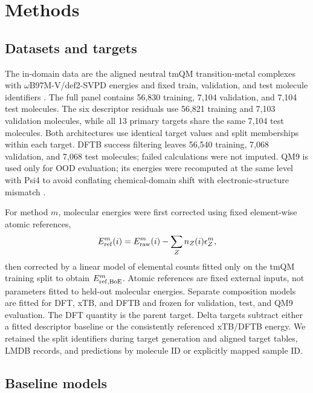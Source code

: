 \section{Methods}
\label{sec:methods}

\subsection{Datasets and targets}
\label{sec:methods-datasets-targets}

The in-domain data are the aligned neutral tmQM transition-metal complexes with \(\omega\)B97M-V/def2-SVPD energies and fixed train, validation, and test molecule identifiers \cite{balcells2020tmqm,mardirossian2016wb97mv,rappoport2010def2svpd}. The full panel contains 56,830 training, 7,104 validation, and 7,104 test molecules. The six descriptor residuals use 56,821 training and 7,103 validation molecules, while all 13 primary targets share the same 7,104 test molecules. Both architectures use identical target values and split memberships within each target. DFTB success filtering leaves 56,540 training, 7,068 validation, and 7,068 test molecules; failed calculations were not imputed. QM9 is used only for OOD evaluation; its energies were recomputed at the same level with Psi4 to avoid conflating chemical-domain shift with electronic-structure mismatch \cite{ramakrishnan2014quantum,parrish2017psi4}.

For method \(m\), molecular energies were first corrected using fixed element-wise atomic references,
\begin{equation}
  E_{\rm ref}^{m}(i)=E_{\rm raw}^{m}(i)-\sum_Z n_Z(i)\epsilon_Z^{m},
  \label{eq:atomic-reference}
\end{equation}
then corrected by a linear model of elemental counts fitted only on the tmQM training split to obtain \(E_{\rm ref,BoE}^{m}\). Atomic references are fixed external inputs, not parameters fitted to held-out molecular energies. Separate composition models are fitted for DFT, xTB, and DFTB and frozen for validation, test, and QM9 evaluation. The DFT quantity is the parent target. Delta targets subtract either a fitted descriptor baseline or the consistently referenced xTB/DFTB energy. We retained the split identifiers during target generation and aligned target tables, LMDB records, and predictions by molecule ID or explicitly mapped sample ID.

\subsection{Baseline models}
\label{sec:methods-baselines}

